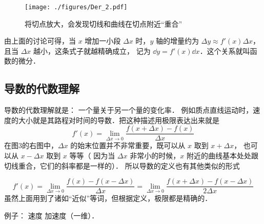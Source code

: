 \begin{figure}[ht]
\centering
\texttt{[image: ./figures/Der\_2.pdf]}
\caption{将切点放大，会发现切线和曲线在切点附近“重合”}
\end{figure}

由上面的讨论可得，当 $x$ 增加一小段 $\Delta x$ 时，$y$ 轴的增量约为 $\Delta y \approx f'(x)\Delta x$，且当 $\Delta x$ 越小，这条式子就越精确成立， 记为 $\dd{y} = f'(x) \dd{x}$．这个关系就叫函数的微分．

\subsection{导数的代数理解}
导数的代数理解就是： 一个量关于另一个量的变化率． 例如质点直线运动时，速度的大小就是其路程对时间的导数．把这种描述用极限表达出来就是
\begin{equation}\label{Der_eq2}
f'(x) = \lim_{\Delta x \to 0} \frac{f(x + \Delta x) - f(x)}{\Delta x}
\end{equation}
在图3的右图中，$\Delta x$ 的始末位置并不非常重要，既可以从 $x$ 取到 $x + \Delta x$， 也可以从 $x - \Delta x$  取到 $x$ 等等（ 因为当 $\Delta x$ 非常小的时候，$x$ 附近的曲线基本处处跟切线重合，它们的斜率都是一样的）． 所以导数的定义也有其他类似的形式

\begin{equation}
f'(x) = \lim_{\Delta x \to 0} \frac{f(x) - f(x - \Delta x)}{\Delta x} = \lim_{\Delta x \to 0} \frac{f(x + \Delta x) - f(x - \Delta x)}{2\Delta x}
\end{equation}
虽然上面用到了诸如“近似”等词，但根据定义，极限都是精确的．

例子： 速度 加速度（一维）．
